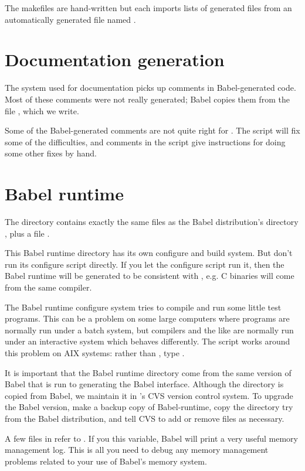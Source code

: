 The makefiles are hand-written but each imports lists of generated files
from an automatically generated file named .

\section{Documentation generation}

The  system used for \hypre{} documentation picks up
comments in Babel-generated code.  Most of these comments were not
really generated; Babel copies them from the file
, which we write.

Some of the Babel-generated comments are not quite right for
.  The script  will fix some of the
difficulties, and comments in the script give instructions for doing
some other fixes by hand.

\section{Babel runtime}

The directory  contains exactly the same files as the
Babel distribution's directory , plus a file
.

This Babel runtime directory has its own configure and build system.
But don't run its configure script directly.  If you let the \hypre{}
configure script run it, then the Babel runtime will be generated to
be consistent with \hypre{} , e.g. C binaries will come from the same
compiler.

The Babel runtime configure system tries to compile and run some
little test programs.  This can be a problem on some large computers
where programs are normally run under a batch system, but compilers
and the like are normally run under an interactive system which
behaves differently.  The script  works around this
problem on AIX systems: rather than , type
.

It is important that the Babel runtime directory come from the same
version of Babel that is run to generating the Babel interface.
Although the directory is copied from Babel, we maintain it in
\hypre{}'s CVS version control system.  To upgrade the Babel version,
make a backup copy of Babel-runtime, copy the directory try from the
Babel distribution, and tell CVS to add or remove files as necessary.

A few files in  refer to
.  If you  this variable,
Babel will print a very useful memory management log.  This is all you
need to debug any memory management problems related to your use of
Babel's memory system.

